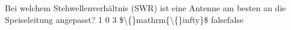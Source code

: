     {Bei welchem Stehwellenverhältnis (SWR) ist eine Antenne am besten an die Speiseleitung angepasst?}
    {1}
    {0}
    {3}
    {\$\textbackslash\{\}mathrm\{\textbackslash\{\}infty\}\$}
    {false}{false}